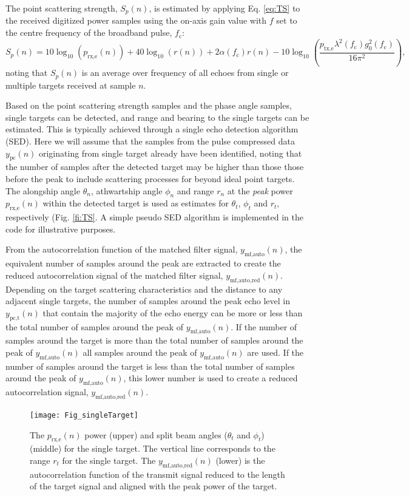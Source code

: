 \documentclass[preprint,12pt,TurnOnLineNumbers]{JASAnew}
\newcommand{\samplesymt}{n}
\newcommand{\fc}{f_{\textrm{c}}}
\newcommand{\ptxe}{p_{\textrm{tx,e}}}
\newcommand{\prxe}{p_{\textrm{rx,e}}}
\newcommand{\ypc}{y_{\textrm{pc}}}
\newcommand{\ypctarget}{y_{\textrm{pc,t}}}
\newcommand{\ymfauto}{y_{\textrm{mf,auto}}}
\newcommand{\ymfautored}{y_{\textrm{mf,auto,red}}}
\newcommand{\mysp}{S_p}
\newcommand{\range}{r}
\newcommand{\athw}{\phi}
\newcommand{\along}{\theta}
\newcommand{\gainzero}{g_0}
\newcommand{\wlen}{\lambda}
\newcommand{\absorp}{\alpha}
\begin{document}
The point scattering strength, $\mysp(\samplesymt)$, is estimated by applying Eq. \ref{eq:TS} to the received digitized power samples using the on-axis gain value with $f$ set to the centre frequency of the broadband pulse, $\fc$: 
\begin{equation}
\label{eq:Sp}
\mysp(\samplesymt) = 10\log_{10}(\prxe(\samplesymt)) + 40\log_{10}(\range(\samplesymt)) 
+ 2\absorp(\fc) \range(\samplesymt) - 10\log_{10}\left( \frac{\ptxe \wlen^2(\fc) \gainzero^2(\fc)}{16\pi^2} \right),
\end{equation}
%
noting that $\mysp(\samplesymt)$ is an average over frequency of all echoes from single or multiple targets received at sample $\samplesymt$.

Based on the point scattering strength samples and the phase angle samples, single targets can be detected, and range and bearing to the single targets can be estimated. This is typically achieved through a single echo detection algorithm (SED). Here we will assume that the samples from the pulse compressed data $\ypc(\samplesymt)$ originating from single target already have been identified, noting that the number of samples after the detected target may be higher than those those before the peak to include scattering processes for beyond ideal point targets. The alongship angle $\along_n$, athwartship angle $\athw_n$ and range $r_n$ at the \emph{peak} power $\prxe(\samplesymt)$ within the detected target is used as estimates for $\along_t$, $\athw_t$ and $r_t$, respectively (Fig. \ref{fi:TS}. A simple pseudo SED algorithm is implemented in the code for illustrative purposes.

From the autocorrelation function of the matched filter signal, $\ymfauto(\samplesymt)$, the equivalent number of samples around the peak are extracted to create the reduced autocorrelation signal of the matched filter signal, $\ymfautored(\samplesymt)$. Depending on the target scattering characteristics and the distance to any adjacent single targets, the number of samples around the peak echo level in $\ypctarget(\samplesymt)$ that contain the majority of the echo energy can be more or less than the total number of samples around the peak of $\ymfauto(\samplesymt)$. If the number of samples around the target is more than the total number of samples around the peak of $\ymfauto(\samplesymt)$ all samples around the peak of $\ymfauto(\samplesymt)$ are used. If the number of samples around the target is less than the total number of samples around the peak of $\ymfauto(\samplesymt)$, this lower number is used to create a reduced autocorrelation signal, $\ymfautored(\samplesymt)$.
%
\begin{figure}
\texttt{[image: Fig\_singleTarget]}
\caption{\label{fi:SED} The $\prxe(\samplesymt)$ power (upper) and split beam angles ($\along_t$ and $\athw_t$) (middle) for the single target. The vertical line corresponds to the range $r_t$ for the single target. The $\ymfautored(\samplesymt)$ (lower) is the autocorrelation function of the transmit signal reduced to the length of the target signal and aligned with the peak power of the target.}
\end{figure}
\end{document}
